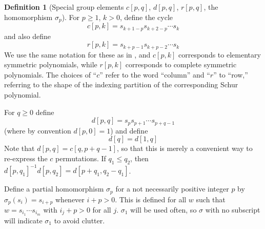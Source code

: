 \documentclass[reqno]{amsart}
\theoremstyle{definition}
\newtheorem{definition}[lemma]{Definition}
\theoremstyle{remark}
\numberwithin{equation}{subsection}
\begin{document}
\begin{definition}[Special group elements {$c[p,q]$}, {$d[p,q]$}, {$r[p,q]$}, the homomorphism $\sigma_p$] \label{definition:specelem}
	For $p\geq 1$, $k>0$, define the cycle 
	$$c[p,k]=s_{k+1-p}s_{k+2-p}\cdots s_k$$
	and also define
	$$r[p,k]=s_{k+p-1}s_{k+p-2}\cdots s_k$$
	We use the same notation for these as in \cite{sottile}, and $c[p,k]$ corresponds to elementary symmetric polynomials, while $r[p,k]$ corresponds to complete symmetric polynomials. The choices of ``$c$'' refer to the word ``column'' and ``$r$'' to ``row,'' referring to the shape of the indexing partition of the corresponding Schur polynomial.
	
	For $q\geq 0$ define
	$$d[p,q]=s_ps_{p+1}\cdots s_{p+q-1}$$
	(where by convention $d[p,0]=1$) and define 
	$$d[q]=d[1,q]$$
	Note that $d[p,q]=c[q,p+q-1]$, so that this is merely a convenient way to re-express the $c$ permutations. If $q_1\leq q_2$, then $d[p,q_1]^{-1}d[p,q_2]=d[p+q_1,q_2-q_1]$.
	
		
		Define a partial homomorphism $\sigma_p$ for a not necessarily positive integer $p$ by $\sigma_p(s_i)=s_{i+p}$ whenever $i+p>0$. This is defined for all $w$ such that $w=s_{i_1}\cdots s_{i_m}$ with $i_j+p>0$ for all $j$. $\sigma_1$ will be used often, so $\sigma$ with no subscript will indicate $\sigma_1$ to avoid clutter.
	\end{definition}
	
\end{document}
